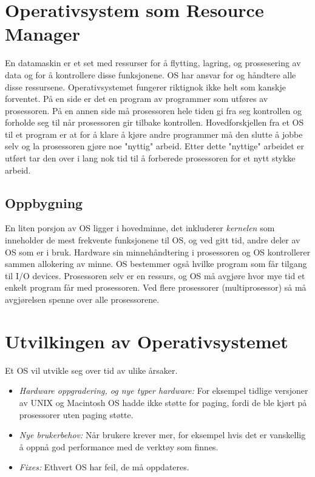 \section{Operativsystem som Resource Manager}
En datamaskin er et set med ressurser for å flytting, lagring, og prossesering av data og for å kontrollere disse funksjonene. OS har ansvar for og håndtere alle disse ressursene. 
Operativsystemet fungerer riktignok ikke helt som kanskje forventet. På en side er det en program av programmer som utføres av prosessoren. 
På en annen side må prosessoren hele tiden gi fra seg kontrollen og forholde seg til når prosessoren gir tilbake kontrollen. 
Hovedforskjellen fra et OS til et program er at for å klare å kjøre andre programmer må den slutte å jobbe selv og la prosessoren gjøre noe "nyttig" arbeid. Etter dette "nyttige" arbeidet er utført tar den over i lang nok tid til å forberede prosessoren for et nytt stykke arbeid. 

\subsection{Oppbygning}
En liten porsjon av OS ligger i hovedminne, det inkluderer \emph{kernelen} som inneholder de mest frekvente funksjonene til OS, og ved gitt tid, andre deler av OS som er i bruk. Hardware sin minnehåndtering i prosessoren og OS kontrollerer sammen allokering av minne. OS bestemmer også hvilke program som får tilgang til I/O devices. Prosessoren selv er en ressurs, og OS må avgjøre hvor mye tid et enkelt program får med prosessoren. Ved flere prosessorer (multiprosessor) så må avgjørelsen spenne over alle prosessorene. 
\section{Utvilkingen av Operativsystemet}
Et OS vil utvikle seg over tid av ulike årsaker.
\begin{itemize}
\item \emph{Hardware oppgradering, og nye typer hardware:} For eksempel tidlige versjoner av UNIX og Macintosh OS hadde ikke støtte for paging, fordi de ble kjørt på prosessorer uten paging støtte. 
\item \emph{Nye brukerbehov:} Når brukere krever mer, for eksempel hvis det er vanskellig å oppnå god performance med de verktøy som finnes.
\item \emph{Fixes:} Ethvert OS har feil, de må oppdateres.
\end{itemize}

